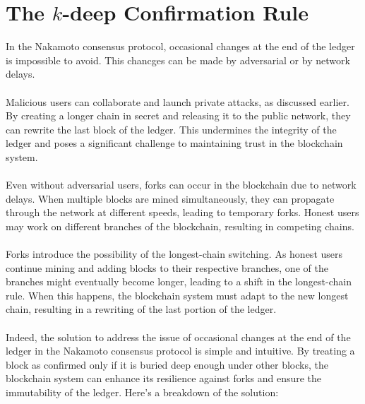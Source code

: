 \documentclass{report}
\begin{document}
\section{The $k$-deep Confirmation Rule}
In the Nakamoto consensus protocol, occasional changes at the end of the ledger is impossible to avoid. This chancges can be made by adversarial or by network delays.\\\\
Malicious users can collaborate and launch private attacks, as discussed earlier. By creating a longer chain in secret and releasing it to the public network, they can rewrite the last block of the ledger. This undermines the integrity of the ledger and poses a significant challenge to maintaining trust in the blockchain system.\\\\
Even without adversarial users, forks can occur in the blockchain due to network delays. When multiple blocks are mined simultaneously, they can propagate through the network at different speeds, leading to temporary forks. Honest users may work on different branches of the blockchain, resulting in competing chains.\\\\
Forks introduce the possibility of the longest-chain switching. As honest users continue mining and adding blocks to their respective branches, one of the branches might eventually become longer, leading to a shift in the longest-chain rule. When this happens, the blockchain system must adapt to the new longest chain, resulting in a rewriting of the last portion of the ledger.\\\\
Indeed, the solution to address the issue of occasional changes at the end of the ledger in the Nakamoto consensus protocol is simple and intuitive. By treating a block as confirmed only if it is buried deep enough under other blocks, the blockchain system can enhance its resilience against forks and ensure the immutability of the ledger. Here's a breakdown of the solution:
\end{document}

